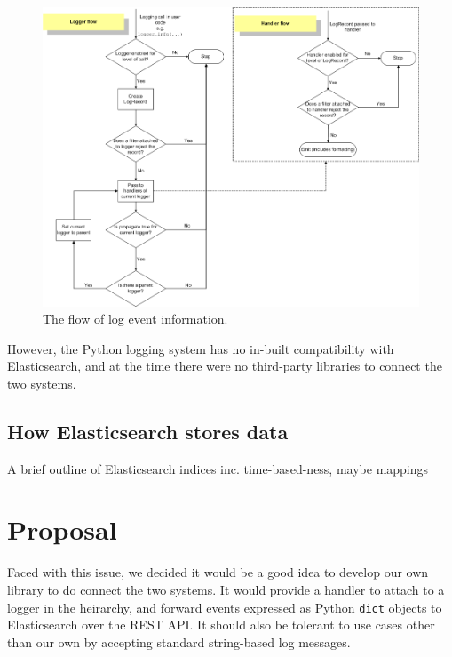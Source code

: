 \documentclass[a4paper,11pt]{article} %
\begin{document}
\begin{figure}[H]\centering
  \includegraphics[width=\textwidth]{logging_flow}
  \caption{The flow of log event information.\protect\footnotemark}
\label{fig:pythonlogging.flowdiagram}
\end{figure}

However, the Python logging system has no in-built compatibility with
Elasticsearch, and at the time there were no third-party libraries to connect
the two systems.

\subsection{How Elasticsearch stores data}
\label{sec:elasticsearch}
A brief outline of Elasticsearch indices inc. time-based-ness, maybe mappings

\section{Proposal}
\label{sec:proposal}
Faced with this issue, we decided it would be a good idea to develop our own
library to do connect the two systems.  It would provide a handler to attach to
a logger in the heirarchy, and forward events expressed as Python \texttt{dict}
objects to Elasticsearch over the REST API.  It should also be tolerant to use
cases other than our own by accepting standard string-based log messages.
\end{document}
